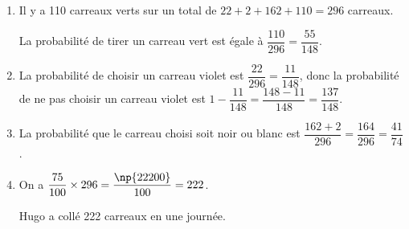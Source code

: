 
%
%
%
%
%

\medskip
\begin{enumerate}
\item %
Il y a 110 carreaux verts sur un total de $22 + 2 + 162 + 110 = 296$ carreaux.

La probabilité de tirer un carreau vert est égale à $\dfrac{110}{296} = \dfrac{55}{148}$.
\item %
La probabilité de choisir un carreau violet est $\dfrac{22}{296} = \dfrac{11}{148}$, donc la probabilité de ne pas choisir un carreau violet est $1 - \dfrac{11}{148} = \dfrac{148 - 11}{148} = \dfrac{137}{148}$.
\item %
La probabilité que le carreau choisi soit noir ou blanc est $\dfrac{162 + 2}{296} = \dfrac{164}{296} = \dfrac{41}{74}$.
\item %
On a $\dfrac{75}{100} \times 296 = \dfrac{\np{22200}}{100} = 222$.

Hugo a collé 222 carreaux en une journée.
\end{enumerate}

\vspace{0.5cm}

